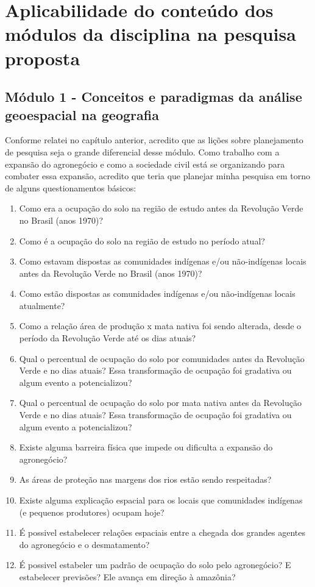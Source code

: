 \section{Aplicabilidade do conteúdo dos módulos da disciplina na pesquisa proposta}

\subsection{Módulo 1 - Conceitos e paradigmas da análise geoespacial na geografia}

Conforme relatei no capítulo anterior, acredito que as lições sobre planejamento de pesquisa seja o grande diferencial desse módulo. Como trabalho com a expansão do agronegócio e como a sociedade civil está se organizando para combater essa expansão, acredito que teria que planejar minha pesquisa em torno de alguns questionamentos básicos:

\begin{enumerate}
  \item Como era a ocupação do solo na região de estudo antes da Revolução Verde no Brasil (anos 1970)?
  \item Como é a ocupação do solo na região de estudo no período atual?
  \item Como estavam dispostas as comunidades indígenas e/ou não-indígenas locais antes da Revolução Verde no Brasil (anos 1970)?
  \item Como estão dispostas as comunidades indígenas e/ou não-indígenas locais atualmente?
  \item Como a relação área de produção x mata nativa foi sendo alterada, desde o período da Revolução Verde até os dias atuais?
  \item Qual o percentual de ocupação do solo por comunidades antes da Revolução Verde e no dias atuais? Essa transformação de ocupação foi gradativa ou algum evento a potencializou?
  \item Qual o percentual de ocupação do solo por mata nativa antes da Revolução Verde e no dias atuais? Essa transformação de ocupação foi gradativa ou algum evento a potencializou?
  \item Existe alguma barreira física que impede ou dificulta a expansão do agronegócio?
  \item As áreas de proteção nas margens dos rios estão sendo respeitadas?
  \item Existe alguma explicação espacial para os locais que comunidades indígenas (e pequenos produtores) ocupam hoje?
  \item É possivel estabelecer relações espaciais entre a chegada dos grandes agentes do agronegócio e o desmatamento?
  \item É possivel estabeler um padrão de ocupação do solo pelo agronegócio? E estabelecer previsões? Ele avança em direção à amazônia?
\end{enumerate}

